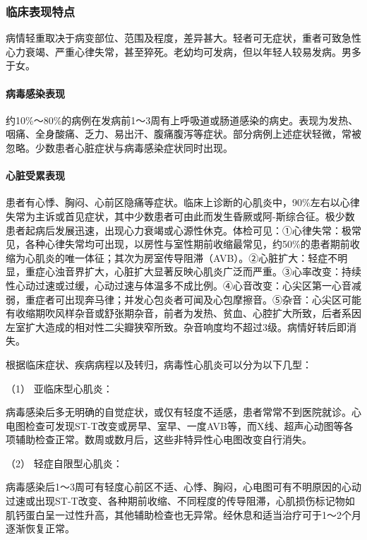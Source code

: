 \subsubsection{临床表现特点}

病情轻重取决于病变部位、范围及程度，差异甚大。轻者可无症状，重者可致急性心力衰竭、严重心律失常，甚至猝死。老幼均可发病，但以年轻人较易发病。男多于女。

\paragraph{病毒感染表现}

约10\%～80\%的病例在发病前1～3周有上呼吸道或肠道感染的病史。表现为发热、咽痛、全身酸痛、乏力、易出汗、腹痛腹泻等症状。部分病例上述症状轻微，常被忽略。少数患者心脏症状与病毒感染症状同时出现。

\paragraph{心脏受累表现}

患者有心悸、胸闷、心前区隐痛等症状。临床上诊断的心肌炎中，90\%左右以心律失常为主诉或首见症状，其中少数患者可由此而发生昏厥或阿-斯综合征。极少数患者起病后发展迅速，出现心力衰竭或心源性休克。体检可见：①心律失常：极常见，各种心律失常均可出现，以房性与室性期前收缩最常见，约50\%的患者期前收缩为心肌炎的唯一体征；其次为房室传导阻滞（AVB）。②心脏扩大：轻症不明显，重症心浊音界扩大，心脏扩大显著反映心肌炎广泛而严重。③心率改变：持续性心动过速或过缓，心动过速与体温多不成比例。④心音改变：心尖区第一心音减弱，重症者可出现奔马律；并发心包炎者可闻及心包摩擦音。⑤杂音：心尖区可能有收缩期吹风样杂音或舒张期杂音，前者为发热、贫血、心腔扩大所致，后者系因左室扩大造成的相对性二尖瓣狭窄所致。杂音响度均不超过3级。病情好转后即消失。

根据临床症状、疾病病程以及转归，病毒性心肌炎可以分为以下几型：

\hypertarget{text00304.htmlux5cux23CHP10-5-2-1-2-1}{}
（1） 亚临床型心肌炎：

病毒感染后多无明确的自觉症状，或仅有轻度不适感，患者常常不到医院就诊。心电图检查可发现ST-T改变或房早、室早、一度AVB等，而X线、超声心动图等各项辅助检查正常。数周或数月后，这些非特异性心电图改变自行消失。

\hypertarget{text00304.htmlux5cux23CHP10-5-2-1-2-2}{}
（2） 轻症自限型心肌炎：

病毒感染后1～3周可有轻度心前区不适、心悸、胸闷，心电图可有不明原因的心动过速或出现ST-T改变、各种期前收缩、不同程度的传导阻滞，心肌损伤标记物如肌钙蛋白呈一过性升高，其他辅助检查也无异常。经休息和适当治疗可于1～2个月逐渐恢复正常。

